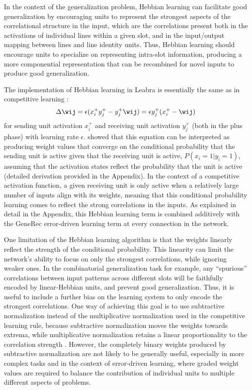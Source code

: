 \documentclass[12pt,twoside]{article}
\begin{document}
In the context of the generalization problem, Hebbian learning can
facilitate good generalization by encouraging units to represent the
strongest aspects of the correlational structure in the input, which
are the correlations present both in the activations of individual
lines within a given slot, and in the input/output mapping between
lines and line identity units.  Thus, Hebbian learning should
encourage units to specialize on representing intra-slot information,
producing a more componential representation that can be recombined
for novel inputs to produce good generalization.

The implementation of Hebbian learning in Leabra is essentially the
same as in competitive learning \cite{RumelhartZipser86,Nowlan90}:
\begin{equation}
  \Delta \wij = \epsilon (x^+_i y^+_j - y^+_j \wij) = \epsilon y^+_j (x^+_i - \wij)
  \label{eq.hebb}
\end{equation}
for sending unit activation $x^+_i$ and receiving unit activation
$y^+_j$ (both in the plus phase) with learning rate $\epsilon$.
 showed that this equation can be
interpreted as producing weight values that converge on the
conditional probability that the sending unit is active given that the
receiving unit is active, $P(x_i=1 | y_i=1)$, assuming that the
activation states reflect the probability that the unit is active
(detailed derivation provided in the Appendix).  In the context of a
competitive activation function, a given receiving unit is only active
when a relatively large number of inputs align with its weights,
meaning that this conditional probability learning comes to reflect
the strong correlations in the inputs.  As explained in detail in the
Appendix, this Hebbian learning term is combined additively with the
GeneRec error-driven learning term at every connection in the network.

One limitation of the Hebbian learning algorithm is that the weights
linearly reflect the strength of the conditional probability.  This
linearity can limit the network's ability to focus on only the
strongest correlations, while ignoring weaker ones.  In the
combinatorial generalization task for example, any ``spurious''
correlations between input patterns across different slots will be
faithfully encoded by linear-Hebbian units, and prevent good
generalization.  Thus, it is useful to include a further bias on the
learning system to only encode the strongest correlations.  One way of
achieving this goal is to use subtractive normalization instead of the
multiplicative normalization used in the competitive learning rule,
because subtractive normalization moves the weights towards extrema,
while multiplicative normalization retains a linear proportionality to
the correlation strength \cite{MillerMacKay94,GoodhillBarrow94}.
However, the completely binary weights produced by subtractive
normalization are not likely to be generally useful, especially in
more complex tasks and in the context of error-driven learning, where
graded weight values are required to balance the contribution of
individual units to multiple different aspects of problems.
\end{document}
